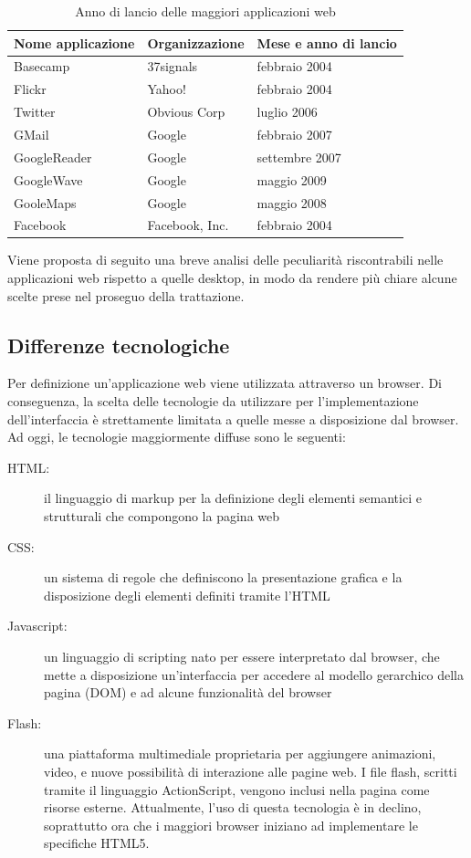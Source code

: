 \begin{table}[htdp]
\caption{Anno di lancio delle maggiori applicazioni web}
\begin{center}
\begin{tabular}{l l l}
	\hline
	\textbf{Nome applicazione} & \textbf{Organizzazione} & \textbf{Mese e anno di lancio} \\
	\hline
	Basecamp & 37signals & febbraio 2004\\ 
	\hline
	Flickr & Yahoo! & febbraio 2004\\ 
	\hline
	Twitter & Obvious Corp & luglio 2006\\
	\hline
	GMail & Google & febbraio 2007\\
	\hline
	GoogleReader & Google & settembre 2007\\
	\hline
	GoogleWave & Google & maggio 2009\\
	\hline
	GooleMaps & Google & maggio 2008\\
	\hline
	Facebook & Facebook, Inc. & febbraio 2004\\
	\hline
\end{tabular}
\end{center}
\label{default}
\end{table}

Viene proposta di seguito una breve analisi delle peculiarità riscontrabili nelle applicazioni web rispetto a quelle desktop, in modo da rendere più chiare alcune scelte prese nel proseguo della trattazione.

\subsection{Differenze tecnologiche}

Per definizione un'applicazione web viene utilizzata attraverso un browser. Di conseguenza, la scelta delle tecnologie da utilizzare per l'implementazione dell'interfaccia è strettamente limitata a quelle messe a disposizione dal browser. 
Ad oggi, le tecnologie maggiormente diffuse sono le seguenti:

\begin{description}
\item[HTML:] il linguaggio di markup per la definizione degli elementi semantici e strutturali che compongono la pagina web
\item[CSS:] un sistema di regole che definiscono la presentazione grafica e la disposizione degli elementi definiti tramite l'HTML
\item[Javascript:]  un linguaggio di scripting nato per essere interpretato dal browser, che mette a disposizione un'interfaccia per accedere al modello gerarchico della pagina (DOM) e ad alcune funzionalità del browser
\item[Flash:] una piattaforma multimediale proprietaria per aggiungere animazioni, video, e nuove possibilità di interazione alle pagine web. I file flash, scritti tramite il linguaggio ActionScript, vengono inclusi nella pagina come risorse esterne. Attualmente, l'uso di questa tecnologia è in declino,  soprattutto ora che i maggiori browser iniziano ad implementare le specifiche HTML5.
\end{description}

